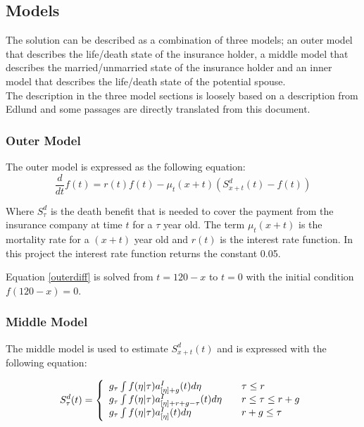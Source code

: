 \subsection{Models}
The solution can be described as a combination of three models; an outer model that describes the life/death state of the insurance holder, a middle model that describes the married/unmarried state of the insurance holder and an inner model that describes the life/death state of the potential spouse. \\

The description in the three model sections is loosely based on a description from Edlund\cite{edlu} and some passages are directly translated from this document.

\subsubsection{Outer Model}
The outer model is expressed as the following equation:
\begin{equation}
\frac{d}{dt} f(t) = r(t) f(t) - \mu_t(x+t) (S_{x+t}^d (t) - f(t)) 
\label{outerdiff}
\end{equation}

Where $S_\tau^d$ is the death benefit that is needed to cover the payment from the insurance company at time $t$ for a $\tau$ year old. The term $\mu_t(x+t)$ is the mortality rate for a $(x + t)$ year old and $r(t)$ is the interest rate function. In this project the interest rate function returns the constant 0.05.

Equation \ref{outerdiff} is solved from $t=120-x$ to $t=0$ with the initial condition $f(120-x)=0$.

\subsubsection{Middle Model}
The middle model is used to estimate $S_{x+t}^d (t)$ and is expressed with the following equation: 

\begin{equation}
S_\tau^d(t) = \left\{ 
  \begin{array}{l l}
    	g_\tau \int	f(\eta|\tau)a_{[\eta] + g}^I(t)d\eta									& \quad \text{$\tau \le r$}\\
    	g_\tau \int	f(\eta|\tau)a_{[\eta] + r + g - \tau}^I(t)d\eta 			& \quad \text{$r \leq \tau \le r + g$}\\
			g_\tau \int	f(\eta|\tau)a_{[\eta]}^I(t)d\eta 											& \quad \text{$r +g \leq \tau$}
  \end{array} \right.
\end{equation} \\

